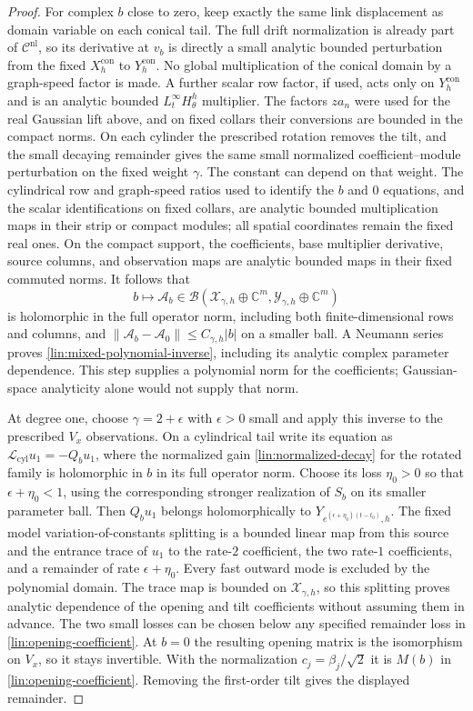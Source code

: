 \begin{proof}
For complex $b$ close to zero, keep exactly the same link displacement
as domain variable on each conical tail.  The full drift normalization is
already part of $\mathcal C^{\mathrm{nl}}$, so its derivative at $v_b$
is directly a small analytic bounded perturbation from the fixed
$X^{\mathrm{con}}_h$ to $Y^{\mathrm{con}}_h$.  No global multiplication
of the conical domain by a graph-speed factor is made.  A further scalar
row factor, if used, acts only on $Y^{\mathrm{con}}_h$ and is an analytic
bounded $L^\infty_tH^h_\theta$ multiplier.  The factors $z a_n$ were used
for the real Gaussian lift above, and on fixed collars their conversions
are bounded in the compact norms.  On each cylinder the
prescribed rotation removes the tilt, and the small decaying remainder
gives the same small normalized coefficient--module perturbation on the
fixed weight $\gamma$.  The constant can depend on that weight.
The cylindrical row and graph-speed ratios used to identify the $b$ and
$0$ equations, and the scalar identifications on fixed collars, are
analytic bounded multiplication maps in their strip or compact modules;
all spatial coordinates remain the fixed real ones.  On the compact
support, the coefficients, base multiplier derivative, source columns,
and observation maps are analytic bounded maps in their fixed commuted
norms.  It follows that
\[
 b\longmapsto\mathcal A_b\in\mathcal B(
 \mathcal X_{\gamma,h}\oplus\mathbb C^m,
 \mathcal Y_{\gamma,h}\oplus\mathbb C^m)
\]
is holomorphic in the full operator norm, including both finite-dimensional
rows and columns, and $\|\mathcal A_b-\mathcal A_0\|\le C_{\gamma,h}|b|$
on a smaller ball.
A Neumann series proves \eqref{lin:mixed-polynomial-inverse}, including
its analytic complex parameter dependence.  This step supplies a
polynomial norm for the coefficients; Gaussian-space analyticity alone
would not supply that norm.

At degree one, choose $\gamma=2+\epsilon$ with $\epsilon>0$ small and
apply this inverse to the prescribed $V_x$ observations.  On a cylindrical
tail write its equation as
$\mathcal L_{\mathrm{cyl}}u_1=-Q_bu_1$, where the normalized gain
\eqref{lin:normalized-decay} for the rotated family is holomorphic in
$b$ in its full operator norm.  Choose its loss $\eta_0>0$ so that
$\epsilon+\eta_0<1$, using the corresponding stronger realization of
$S_b$ on its smaller parameter ball.  Then $Q_bu_1$ belongs holomorphically to
$Y_{e^{(\epsilon+\eta_0)(t-t_0)},h}$.  The fixed model
variation-of-constants splitting is a bounded linear map from this source
and the entrance trace of $u_1$ to the rate-$2$ coefficient, the two
rate-$1$ coefficients, and a remainder of rate $\epsilon+\eta_0$.
Every fast outward mode is excluded by the polynomial domain.
The trace map is bounded on $\mathcal X_{\gamma,h}$, so this splitting
proves analytic dependence of the opening and tilt coefficients without
assuming them in advance.  The two small losses can be chosen below any
specified remainder loss in \eqref{lin:opening-coefficient}.
At $b=0$ the resulting opening matrix is the isomorphism on $V_x$,
so it stays invertible.  With the normalization $c_j=\beta_j/\sqrt2$
it is $M(b)$ in \eqref{lin:opening-coefficient}.  Removing the
first-order tilt gives the displayed remainder.


\end{proof}
